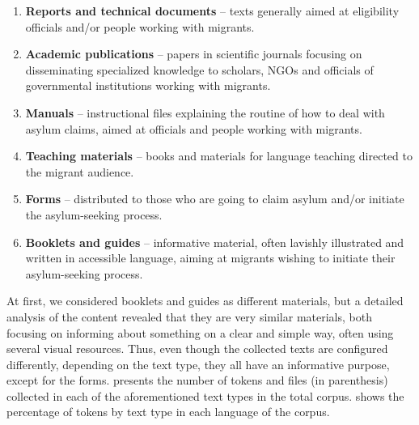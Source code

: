 \documentclass[english]{textolivre}
\begin{document}
\begin{enumerate}[label=\alph*)]
\item \textbf{Reports and technical documents} – texts generally aimed at eligibility officials and/or people working with migrants.

\item \textbf{Academic publications} – papers in scientific journals focusing on disseminating specialized know\-ledge to scholars, NGOs and officials of governmental institutions working with migrants.

\item \textbf{Manuals} – instructional files explaining the routine of how to deal with asylum claims, aimed at officials and people working with migrants.

\item \textbf{Teaching materials} – books and materials for language teaching directed to the migrant audience.

\item \textbf{Forms} – distributed to those who are going to claim asylum and/or initiate the asylum-seeking process.

\item \textbf{Booklets and guides} – informative material, often lavishly illustrated and written in accessible language, aiming at migrants wishing to initiate their asylum-seeking process.
\end{enumerate}

At first, we considered booklets and guides as different materials, but a detailed analysis of the content revealed that they are very similar materials, both focusing on informing about something on a clear and simple way, often using several visual resources. Thus, even though the collected texts are configured differently, depending on the text type, they all have an informative purpose, except for the forms.  presents the number of tokens and files (in parenthesis) collected in each of the aforementioned text types in the total corpus.  shows the percentage of tokens by text type in each language of the corpus.
\end{document}
